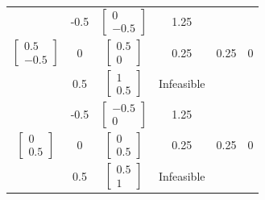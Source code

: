 \documentclass[14pt, a4paper]{extarticle}
\begin{document}
\begin{latin}
\begin{longtable}{|c|c|c|c|c|c|}
			& -0.5 &$\begin{bmatrix} 0 \\ -0.5 \end{bmatrix}$      &      1.25     &        &         \\ \cline{2-4}
			\multirow{-3}{*}{$\begin{bmatrix} 0.5 \\ -0.5 \end{bmatrix}$}& 0   &$\begin{bmatrix} 0.5 \\ 0 \end{bmatrix}$      &       0.25                 &      0.25       &  0  \\ \cline{2-4}
			& 0.5  &$\begin{bmatrix} 1 \\ 0.5 \end{bmatrix}$      & Infeasible                        &   &                \\	\cline{2-4} \hline
			
			&            -0.5            &$\begin{bmatrix} -0.5 \\ 0 \end{bmatrix}$      &     1.25             &         &         \\  \cline{2-4} 
			\multirow{-3}{*}{$\begin{bmatrix} 0 \\ 0.5 \end{bmatrix}$}&        0                &$\begin{bmatrix} 0 \\ 0.5 \end{bmatrix}$      &      0.25                  &  0.25            &  0  \\  \cline{2-4} 
			&           0.5             &$\begin{bmatrix} 0.5 \\ 1 \end{bmatrix}$      & Infeasible                        &          &  \\  \cline{2-4} \hline
			

\end{longtable}
\end{latin}
\end{document}
